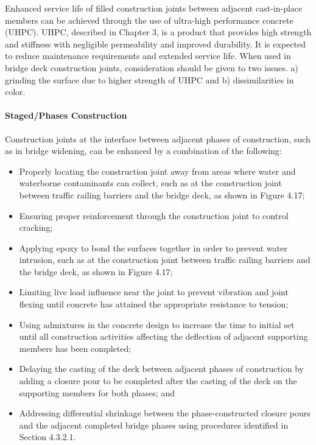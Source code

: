 Enhanced service life of filled construction joints between adjacent cast-in-place members can be achieved
through the use of ultra-high performance concrete (UHPC). UHPC, described in Chapter 3, is a product that
provides high strength and stiffness with negligible permeability and improved durability. It is expected to reduce
maintenance requirements and extended service life. When used in bridge deck construction joints, consideration
should be given to two issues. a) grinding the surface due to higher strength of UHPC and b) dissimilarities in color.

\paragraph{Staged/Phases Construction}
Construction joints at the interface between adjacent phases of construction, such as in bridge widening, can be
enhanced by a combination of the following:
\begin{itemize}
  \item Properly locating the construction joint away from areas where water and waterborne contaminants can
  collect, such as at the construction joint between traffic railing barriers and the bridge deck, as shown in
  Figure 4.17;
  \item Ensuring proper reinforcement through the construction joint to control cracking;
  \item Applying epoxy to bond the surfaces together in order to prevent water intrusion, such as at the construction
  joint between traffic railing barriers and the bridge deck, as shown in Figure 4.17;
  \item Limiting live load influence near the joint to prevent vibration and joint flexing until concrete has attained
  the appropriate resistance to tension;
  \item Using admixtures in the concrete design to increase the time to initial set until all construction activities
  affecting the deflection of adjacent supporting members has been completed;
  \item Delaying the casting of the deck between adjacent phases of construction by adding a closure pour to be
  completed after the casting of the deck on the supporting members for both phases; and
  \item Addressing differential shrinkage between the phase-constructed closure pours and the adjacent completed
  bridge phases using procedures identified in Section 4.3.2.1.
\end{itemize}


